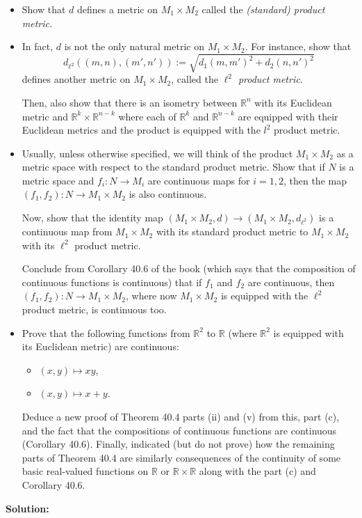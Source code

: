 \documentclass[12pt]{article}
\newcommand\bi{\begin{itemize}}
\newcommand\ei{\end{itemize}}
\newcommand\beq{\begin{equation}}
\newcommand\eeq{\end{equation}}
\newcommand\itema{\item[(a)]}
\newcommand\itemb{\item[(b)]}
\newcommand\itemc{\item[(c)]}
\newcommand\itemd{\item[(d)]}
\renewcommand\|{\ | \ }
\newcommand\ra{\rightarrow}
\newcommand\R{\mathbb{R}}
\def\sol{\textbf{Solution:}}
\newcommand\ltwo{\ell^2}
\begin{document}
\bi
\itema
Show that $d$ defines a metric on $M_1 \times M_2$ called the 
\emph{(standard) product metric.}
\itemb
In fact, $d$ is not the only natural metric on $M_1 \times M_2$. For instance,
show that 
\beq
\label{eq:l2-metric}
d_{\ltwo}((m, n), (m', n')) := \sqrt{ d_1(m, m')^2 + d_2(n, n')^2}
\eeq
defines another metric on $M_1 \times M_2$, called the 
\emph{$\ltwo$ product metric}.

Then, also show that there is an isometry between $\R^n$ with its Euclidean
metric and $\R^k \times \R^{n-k}$ where each of $\R^k$ and $\R^{n - k}$ are
equipped with their Euclidean metrics and the product is equipped with the 
$l^2$ product metric.

\itemc
Usually, unless otherwise specified, we will think of the product 
$M_1 \times M_2$ as a metric space with respect to the standard product metric.
Show that if $N$ is a metric space and $f_i: N \ra M_i$ are continuous maps 
for $i = 1, 2$, then the map $(f_1, f_2): N \ra M_1 \times M_2$ is also
continuous.

Now, show that the identity map 
$(M_1 \times M_2, d) \ra (M_1 \times M_2, d_{\ltwo})$
is a continuous map from $M_1 \times M_2$ with its standard product metric to
$M_1 \times M_2$ with its $\ltwo$ product metric.

Conclude from Corollary 40.6 of the book (which says that the composition of
continuous functions is continuous) that if $f_1$ and $f_2$ are continuous,
then $(f_1, f_2): N \ra M_1 \times M_2$, where now $M_1 \times M_2$ is 
equipped with the $\ltwo$ product metric, is continuous too.

\itemd
Prove that the following functions from $\R^2$ to $\R$ (where $\R^2$ is 
equipped with its Euclidean metric) are continuous:
\bi
\item
$(x, y) \mapsto xy$,
\item
$(x, y) \mapsto x + y$.
\ei
Deduce a new proof of Theorem 40.4 parts (ii) and (v) from this, part (c),
and the fact that the compositions of continuous functions are continuous
(Corollary 40.6). Finally, indicated (but do not prove) how the remaining parts
of Theorem 40.4 are similarly consequences of the continuity of some basic 
real-valued functions on $\R$ or $\R \times \R$ along with the part (c)
and Corollary 40.6.
\ei

\sol
\end{document}

